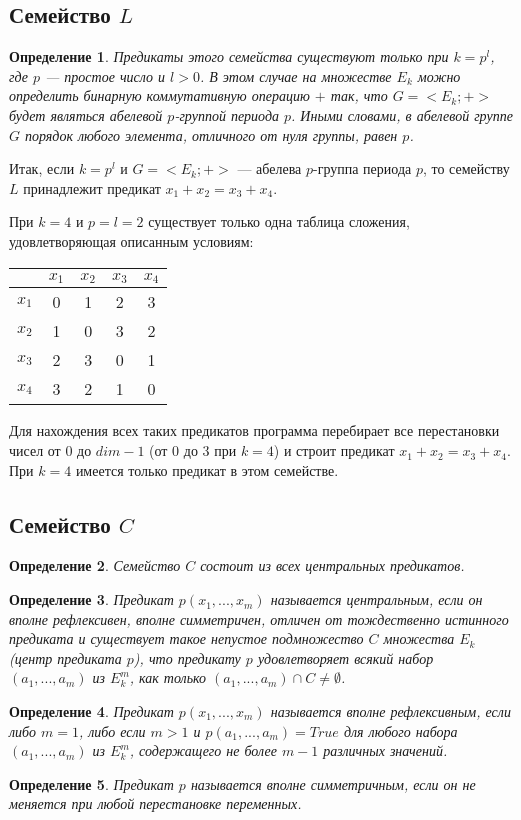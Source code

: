 \documentclass[a4paper,14pt]{extreport}
\newtheorem{opr}{Определение}
\begin{document}
\subsection{Семейство $L$}
\begin{opr}
Предикаты этого семейства существуют только при $k = p^l$, где $p$ — простое число и $l > 0$. В этом случае на множестве $E_k$ можно определить бинарную коммутативную операцию $+$ так, 
что $G = <E_k;+>$ будет являться абелевой $p$-группой периода $p$. Иными словами, в абелевой группе $G$ порядок любого элемента, отличного от нуля группы, равен $p$. 
\end{opr}
Итак, если $k = p^l$ и $G = <E_k; +>$ — абелева $p$-группа периода $p$, то семейству $L$ принадлежит предикат $x_1+x_2=x_3+x_4$. 

При $k=4$ и $p=l=2$ существует только одна таблица сложения, удовлетворяющая описанным условиям: 
\begin{center}
\begin{tabular}{|c|c|c|c|c|}
\hline
&$x_1$&$x_2$&$x_3$&$x_4$\\
\hline
$x_1$&0&1&2&3\\
\hline
$x_2$&1&0&3&2\\
\hline
$x_3$&2&3&0&1\\
\hline
$x_4$&3&2&1&0\\
\hline
\end{tabular}
\end{center}

Для нахождения всех таких предикатов программа перебирает все перестановки чисел от $0$ до $dim-1$ (от $0$ до $3$ при $k=4$) и строит предикат $x_1+x_2=x_3+x_4$. При $k=4$ имеется только предикат в этом семействе.
\subsection{Семейство $C$}
\begin{opr}
Семейство $C$ состоит из всех центральных предикатов.
\end{opr}

\begin{opr} Предикат $p(x_1,...,x_m )$ называется центральным, если он вполне рефлексивен, вполне симметричен, отличен от тождественно истинного предиката и существует такое непустое подмножество $C$ множества $E_k$ (центр предиката $p$),  что предикату $p$ удовлетворяет всякий набор $(a_1,..., a_m)$ из $E_k^m$, как только $(a_1,..., a_m) \cap C \neq \emptyset$.
\end{opr}
\begin{opr}Предикат $p(x_1,..., x_m)$ называется вполне рефлексивным, если либо $m = 1$, либо  если $m > 1$ и $p(a_1,..., a_m) = True$ для любого набора $(a_1,...,a_m)$ из $E_k^m$, содержащего не более $m-1$ различных значений.
\end{opr}
\begin{opr} 
Предикат $p$ называется вполне симметричным, если он не меняется при любой перестановке переменных.  
\end{opr}
\end{document}
